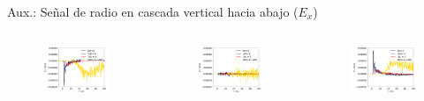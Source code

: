 \documentclass{beamer}
\begin{document}
\begin{frame}[noframenumbering]{Aux.: Señal de radio en cascada vertical hacia abajo ($E_x$)}
		\begin{columns}
		\begin{figure}[H]
			\centering
			\includegraphics[width=.8\linewidth]{figures/radio/p_1e17_0deg_NS_N_v2}
		\end{figure}
		\begin{figure}[H]
			\centering
			\includegraphics[width=.8\linewidth]{figures/radio/p_1e17_0deg_NS_E_v2}
		\end{figure}
		\begin{figure}[H]
			\centering
			\includegraphics[width=.8\linewidth]{figures/radio/p_1e17_0deg_NS_S_v2}

\end{figure}
\end{columns}
\end{frame}
\end{document}
